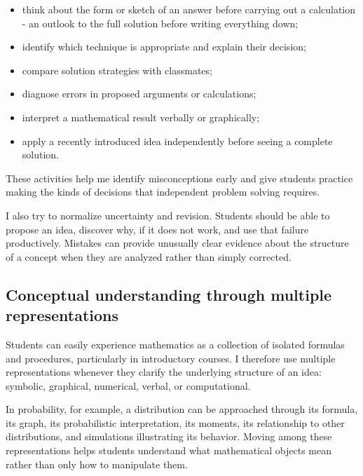 \documentclass[11pt]{article}
\begin{document}
\begin{itemize}
    \item think about the form or sketch of an answer before
    carrying out a calculation -  an outlook to the full solution before writing everything down;
    
    \item identify which technique
    is appropriate and explain their decision;
    
    \item compare solution strategies with classmates;
    
    \item diagnose errors in proposed arguments or
    calculations;
    
    \item interpret a mathematical result verbally or
    graphically;
    
    \item apply a recently introduced idea independently
    before seeing a complete solution.
\end{itemize}

These activities help me identify misconceptions early and
give students practice making the kinds of decisions that
independent problem solving requires.

I also try to normalize uncertainty and revision.
Students should be able to propose an idea,
discover why, if it does not work,
and use that failure productively.
Mistakes can provide unusually clear evidence about the
structure of a concept when they are analyzed rather than
simply corrected.

\subsection{Conceptual understanding through multiple representations}

Students can easily experience mathematics as a collection of
isolated formulas and procedures,
particularly in introductory courses.
I therefore use multiple representations whenever they
clarify the underlying structure of an idea:
symbolic, graphical, numerical, verbal, or computational.

In probability, for example,
a distribution can be approached through its formula,
its graph,
its probabilistic interpretation,
its moments,
its relationship to other distributions,
and simulations illustrating its behavior.
Moving among these representations helps students understand
what mathematical objects mean rather than only how to
manipulate them.
\end{document}
